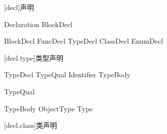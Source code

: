 
[decl]{声明}

\begin{bnf}{Declaration}
    BlockDecl
\end{bnf}

\begin{bnf}{BlockDecl}
    FuncDecl \br
    TypeDecl \br
    ClassDecl \br
    EnumDecl
\end{bnf}

[decl.type]{类型声明}

\begin{bnf}{TypeDecl}
    TypeQual\bnfs {} Identifier TypeBody
\end{bnf}

\begin{bnf}{TypeQual}
\end{bnf}

\begin{bnf}{TypeBody}
    ObjectType \br
    \terminal{=} Type
\end{bnf}

[decl.class]{类声明}
